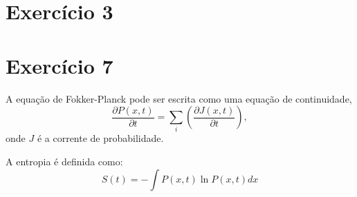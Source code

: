 \documentclass[12pt]{article}
\begin{document}
\section*{Exercício 3}

\section*{Exercício 7}
A equação de Fokker-Planck pode ser escrita como uma equação de continuidade,
\begin{equation}
\frac{\partial P(x,t)}{\partial t} = \sum_i\left( \frac{\partial J(x, t)}{\partial t}\right),
\end{equation}
onde $J$ é a corrente de probabilidade. 

A entropia é definida como:
\begin{equation}
S(t) = -\int P(x,t) \ln P(x,t) dx
\end{equation}
\end{document}
